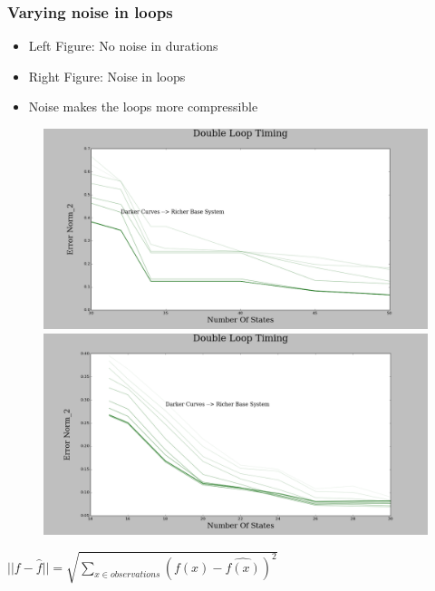 \documentclass{beamer}
\begin{document}


\begin{frame}
\frametitle{Varying noise in loops}

\begin{itemize}
\item Left Figure: No noise in durations
\item Right Figure: Noise in loops
\item Noise makes the loops more compressible
\end{itemize}
\begin{figure}
\includegraphics[width=0.5\linewidth]{lucasplots/monImages/DoubleLoopTiming0.png}

\includegraphics[width=0.5\linewidth]{lucasplots/monImages/DoubleLoopTiming0_1.png}
\end{figure}
$||f - \hat{f}|| = \sqrt{\sum\nolimits_{x \in observations}(f(x) - \hat{f(x)})^2}$ 


\end{frame}

\end{document}
